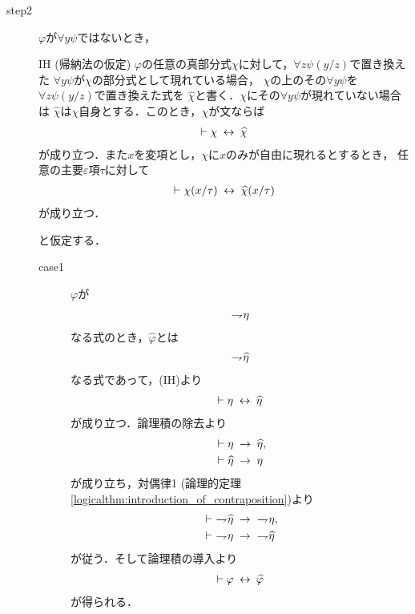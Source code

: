 \begin{sketch}
\begin{description}
			\item[step2]
				$\varphi$が$\forall y \psi$ではないとき，
				\begin{itembox}[l]{IH (帰納法の仮定)}
					$\varphi$の任意の真部分式$\chi$に対して，$\forall z \psi(y/z)$で置き換えた
					$\forall y \psi$が$\chi$の部分式として現れている場合，
					$\chi$の上のその$\forall y \psi$を$\forall z \psi(y/z)$で置き換えた式を
					$\widehat{\chi}$と書く．$\chi$にその$\forall y \psi$が現れていない場合は
					$\widehat{\chi}$は$\chi$自身とする．このとき，$\chi$が文ならば
					\begin{align}
						\vdash \chi \hspace{0.25em}\leftrightarrow\hspace{0.25em} \widehat{\chi}
					\end{align}
					が成り立つ\footnotemark．また$x$を変項とし，$\chi$に$x$のみが自由に現れるとするとき，
					任意の主要$\varepsilon$項$\tau$に対して
					\begin{align}
						\vdash \chi(x/\tau) \hspace{0.25em}\leftrightarrow\hspace{0.25em} \widehat{\chi}(x/\tau)
					\end{align}
					が成り立つ．
				\end{itembox}
				と仮定する．
			
				
			\begin{description}
				\item[case1] $\varphi$が
					\begin{align}
						\rightharpoondown\hspace{-0.25em} \eta
					\end{align}
					なる式のとき，$\widehat{\varphi}$とは
					\begin{align}
						\rightharpoondown\hspace{-0.25em} \widehat{\eta}
					\end{align}
					なる式であって，(IH)より
					\begin{align}
						\vdash \eta \hspace{0.25em}\leftrightarrow\hspace{0.25em} \widehat{\eta}
					\end{align}
					が成り立つ．論理積の除去より
					\begin{align}
						&\vdash \eta \hspace{0.25em}\rightarrow\hspace{0.25em} \widehat{\eta}, \\
						&\vdash \widehat{\eta} \hspace{0.25em}\rightarrow\hspace{0.25em} \eta
					\end{align}
					が成り立ち，対偶律1 (論理的定理\ref{logicalthm:introduction_of_contraposition})より
					\begin{align}
						&\vdash\ \negation \widehat{\eta} \rarrow\ \negation \eta, \\
						&\vdash\ \negation \eta \rarrow\ \negation \widehat{\eta}
					\end{align}
					が従う．そして論理積の導入より
					\begin{align}
						\vdash \varphi \hspace{0.25em}\leftrightarrow\hspace{0.25em} \widehat{\varphi}
					\end{align}
					が得られる．
					

\end{description}
\end{description}
\end{sketch}
